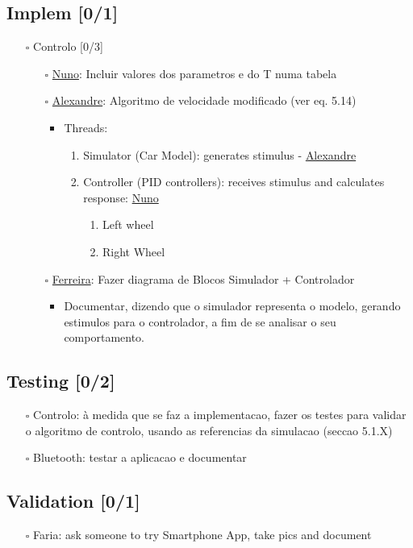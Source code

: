 \documentclass[11pt]{article}
\begin{document}
\subsection{Implem [0/1]}
\label{sec:org4f8bf1b}
\begin{itemize}
\item[{$\square$}] Controlo [0/3]
\begin{itemize}
\item[{$\square$}] \uline{Nuno}: Incluir valores dos parametros e do T numa tabela
\item[{$\square$}] \uline{Alexandre}: Algoritmo de velocidade modificado (ver eq. 5.14)
\begin{itemize}
\item Threads:
\begin{enumerate}
\item Simulator (Car Model): generates stimulus - \uline{Alexandre}
\item Controller (PID controllers): receives stimulus and calculates
response: \uline{Nuno}
\begin{enumerate}
\item Left wheel
\item Right Wheel
\end{enumerate}
\end{enumerate}
\end{itemize}
\item[{$\square$}] \uline{Ferreira}: Fazer diagrama de Blocos Simulador + Controlador
\begin{itemize}
\item Documentar, dizendo que o simulador representa o modelo, gerando
estimulos para o controlador, a fim de se analisar o seu comportamento.
\end{itemize}
\end{itemize}
\end{itemize}
\subsection{Testing [0/2]}
\label{sec:orgd1c10f9}
\begin{itemize}
\item[{$\square$}] Controlo: à medida que se faz a implementacao, fazer os testes para
validar o algoritmo de controlo, usando as referencias da simulacao (seccao
5.1.X)
\item[{$\square$}] Bluetooth: testar a aplicacao e documentar
\end{itemize}
\subsection{Validation [0/1]}
\label{sec:org1ad11ef}
\begin{itemize}
\item[{$\square$}] Faria: ask someone to try Smartphone App, take pics and document
\end{itemize}
\end{document}
